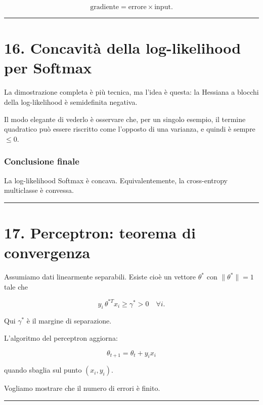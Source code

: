 \documentclass[
]{article}
\begin{document}
\[
\text{gradiente} = \text{errore} \times \text{input}.
\]

\begin{center}\rule{0.5\linewidth}{0.5pt}\end{center}

\section{16. Concavità della log-likelihood per
Softmax}\label{concavituxe0-della-log-likelihood-per-softmax}

La dimostrazione completa è più tecnica, ma l'idea è questa: la Hessiana
a blocchi della log-likelihood è semidefinita negativa.

Il modo elegante di vederlo è osservare che, per un singolo esempio, il
termine quadratico può essere riscritto come l'opposto di una varianza,
e quindi è sempre \(\le 0\).

\subsubsection{Conclusione finale}\label{conclusione-finale}

La log-likelihood Softmax è concava. Equivalentemente, la cross-entropy
multiclasse è convessa.

\begin{center}\rule{0.5\linewidth}{0.5pt}\end{center}

\section{17. Perceptron: teorema di
convergenza}\label{perceptron-teorema-di-convergenza}

Assumiamo dati linearmente separabili. Esiste cioè un vettore
\(\theta^*\) con \(\|\theta^*\|=1\) tale che

\[
y_i\,\theta^{*T}x_i \ge \gamma^* > 0
\quad\forall i.
\]

Qui \(\gamma^*\) è il margine di separazione.

L'algoritmo del perceptron aggiorna:

\[
\theta_{t+1}=\theta_t+y_i x_i
\]

quando sbaglia sul punto \((x_i,y_i)\).

Vogliamo mostrare che il numero di errori è finito.

\begin{center}\rule{0.5\linewidth}{0.5pt}\end{center}
\end{document}
